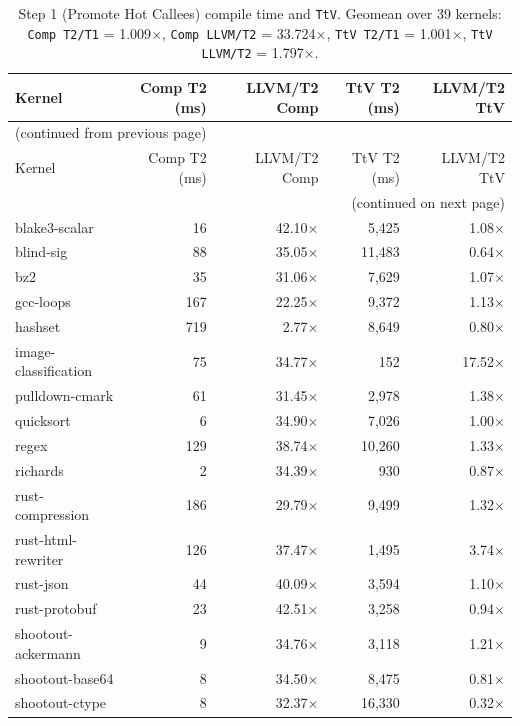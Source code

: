 \begin{longtable}{l r r r r}
\caption{Step 1 (Promote Hot Callees) compile time and \texttt{TtV}. Geomean over 39 kernels: \texttt{Comp T2/T1} = 1.009$\times$, \texttt{Comp LLVM/T2} = 33.724$\times$, \texttt{TtV T2/T1} = 1.001$\times$, \texttt{TtV LLVM/T2} = 1.797$\times$.}
\label{tbl:appB:step1:ct}\\
\toprule
Kernel & Comp T2 (ms) & LLVM/T2 Comp & TtV T2 (ms) & LLVM/T2 TtV \\
\midrule
\endfirsthead
\multicolumn{5}{l}{\small (continued from previous page)} \\
\toprule
Kernel & Comp T2 (ms) & LLVM/T2 Comp & TtV T2 (ms) & LLVM/T2 TtV \\
\midrule
\endhead
\midrule
\multicolumn{5}{r}{\small (continued on next page)} \\
\endfoot
\bottomrule
\endlastfoot
blake3-scalar & 16 & 42.10$\times$ & 5{,}425 & 1.08$\times$ \\
blind-sig & 88 & 35.05$\times$ & 11{,}483 & 0.64$\times$ \\
bz2 & 35 & 31.06$\times$ & 7{,}629 & 1.07$\times$ \\
gcc-loops & 167 & 22.25$\times$ & 9{,}372 & 1.13$\times$ \\
hashset & 719 & 2.77$\times$ & 8{,}649 & 0.80$\times$ \\
image-classification & 75 & 34.77$\times$ & 152 & 17.52$\times$ \\
pulldown-cmark & 61 & 31.45$\times$ & 2{,}978 & 1.38$\times$ \\
quicksort & 6 & 34.90$\times$ & 7{,}026 & 1.00$\times$ \\
regex & 129 & 38.74$\times$ & 10{,}260 & 1.33$\times$ \\
richards & 2 & 34.39$\times$ & 930 & 0.87$\times$ \\
rust-compression & 186 & 29.79$\times$ & 9{,}499 & 1.32$\times$ \\
rust-html-rewriter & 126 & 37.47$\times$ & 1{,}495 & 3.74$\times$ \\
rust-json & 44 & 40.09$\times$ & 3{,}594 & 1.10$\times$ \\
rust-protobuf & 23 & 42.51$\times$ & 3{,}258 & 0.94$\times$ \\
shootout-ackermann & 9 & 34.76$\times$ & 3{,}118 & 1.21$\times$ \\
shootout-base64 & 8 & 34.50$\times$ & 8{,}475 & 0.81$\times$ \\
shootout-ctype & 8 & 32.37$\times$ & 16{,}330 & 0.32$\times$ \\

\end{longtable}
